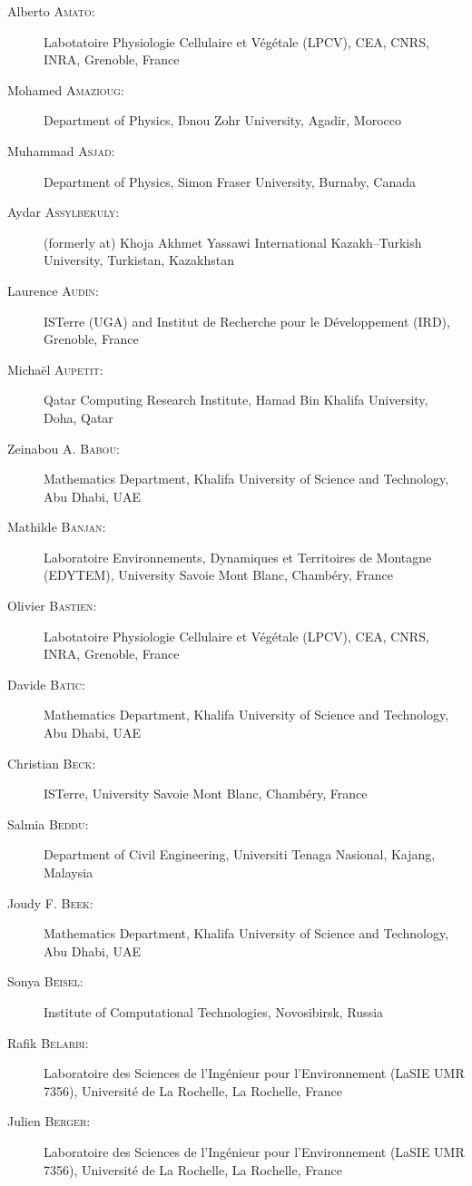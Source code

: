 \begin{description}
  \item[Alberto \textsc{Amato}:] Labotatoire Physiologie Cellulaire et V\'eg\'etale (LPCV), CEA, CNRS, INRA, Grenoble, France
  \item[Mohamed \textsc{Amazioug}:] Department of Physics, Ibnou Zohr University, Agadir, Morocco
  \item[Muhammad \textsc{Asjad}:] Department of Physics, Simon Fraser University, Burnaby, Canada
  \item[Aydar \textsc{Assylbekuly}:] (formerly at) Khoja Akhmet Yassawi International Kazakh--Turkish University, Turkistan, Kazakhstan
  \item[Laurence \textsc{Audin}:] ISTerre (UGA) and Institut de Recherche pour le D\'eveloppement (IRD), Grenoble, France
  \item[Micha\"el \textsc{Aupetit}:] Qatar Computing Research Institute, Hamad Bin Khalifa University, Doha, Qatar
  \item[Zeinabou A. \textsc{Babou}:] Mathematics Department, Khalifa University of Science and Technology, Abu Dhabi, UAE
  \item[Mathilde \textsc{Banjan}:] Laboratoire Environnements, Dynamiques et Territoires de Montagne (EDYTEM), University Savoie Mont Blanc, Chamb\'ery, France
  \item[Olivier \textsc{Bastien}:] Labotatoire Physiologie Cellulaire et V\'eg\'etale (LPCV), CEA, CNRS, INRA, Grenoble, France
  \item[Davide \textsc{Batic}:] Mathematics Department, Khalifa University of Science and Technology, Abu Dhabi, UAE
  \item[Christian \textsc{Beck}:] ISTerre, University Savoie Mont Blanc, Chamb\'ery, France
  \item[Salmia \textsc{Beddu}:] Department of Civil Engineering, Universiti Tenaga Nasional, Kajang, Malaysia
  \item[Joudy F. \textsc{Beek}:] Mathematics Department, Khalifa University of Science and Technology, Abu Dhabi, UAE
  \item[Sonya \textsc{Beisel}:] Institute of Computational Technologies, Novosibirsk, Russia
  \item[Rafik \textsc{Belarbi}:] Laboratoire des Sciences de l'Ing\'enieur pour l'Environnement (LaSIE UMR 7356), Universit\'e de La Rochelle, La Rochelle, France
  \item[Julien \textsc{Berger}:] Laboratoire des Sciences de l'Ing\'enieur pour l'Environnement (LaSIE UMR 7356), Universit\'e de La Rochelle, La Rochelle, France

\end{description}
